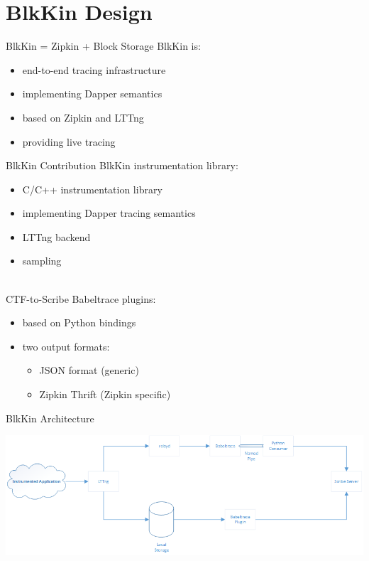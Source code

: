 \section{BlkKin Design}

\begin{frame}{BlkKin = Zipkin + Block Storage}
BlkKin is:
\hfill \\
\begin{itemize}
\item end-to-end tracing infrastructure
\item implementing Dapper semantics
\item based on Zipkin and LTTng 
\item providing live tracing
\end{itemize}
\end{frame}

\begin{frame}{BlkKin Contribution}
BlkKin instrumentation library:
\begin{itemize}
\item C/C++ instrumentation library
\item implementing Dapper tracing semantics
\item LTTng backend
\item sampling
\end{itemize}

\hfill \\
CTF-to-Scribe Babeltrace plugins:
\begin{itemize}
\item based on Python bindings
\item two output formats: 
    \begin{itemize}
    \item JSON format (generic)
    \item Zipkin Thrift (Zipkin specific)
    \end{itemize}
\end{itemize}
\end{frame}

\begin{frame}{BlkKin Architecture}
\begin{center}
\includegraphics[scale=0.52]{images/blkin-internal.png}
\end{center}
\end{frame}

